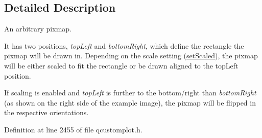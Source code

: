 \subsection{Detailed Description}
An arbitrary pixmap. 

 It has two positions, {\itshape top\-Left} and {\itshape bottom\-Right}, which define the rectangle the pixmap will be drawn in. Depending on the scale setting (\hyperlink{class_q_c_p_item_pixmap_aea813ff1b12163ae5d3ac182593b1d6f}{set\-Scaled}), the pixmap will be either scaled to fit the rectangle or be drawn aligned to the top\-Left position.

If scaling is enabled and {\itshape top\-Left} is further to the bottom/right than {\itshape bottom\-Right} (as shown on the right side of the example image), the pixmap will be flipped in the respective orientations. 

Definition at line 2455 of file qcustomplot.\-h.



